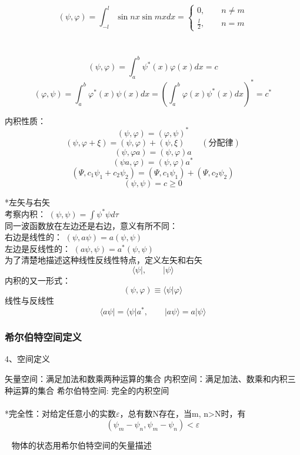 \begin{frame} 
    \frametitle{}
    \例 [3. 求定义在实数空间的两函数的内积]{\[\psi(x)=\sin nx, \varphi(x)=\sin mx\]}
    \解 ~ \[(\psi, \varphi)=\int_{-l} ^{l} \sin nx \sin mx dx=\begin{cases}
         0, \qquad n\neq m \\
        \frac{l}{2} , \qquad n=m
    \end{cases}
    \]
\end{frame} 

\begin{frame} 
    \frametitle{}
    \例 [4. 求定义在复数空间的两函数的内积]{}
    \解 ~ \[(\psi, \varphi)=\int_a ^b \psi^*(x)  \varphi(x) dx=c\]
    \[(\varphi,\psi)=\int_a ^b \varphi^*(x)\psi(x) dx = (\int_a ^b \varphi(x)\psi^*(x) dx) ^* =c^*\]
\end{frame} 

\begin{frame}
    内积性质：
    \[(\psi, \varphi)= (\varphi,\psi)^* \]
    \[(\psi, \varphi+\xi)= (\psi, \varphi) + (\psi, \xi)\qquad (\text{分配律})\]
    \[(\psi, \varphi a)= (\psi, \varphi )a \]
    \[(\psi a, \varphi )= (\psi, \varphi )a^* \]    
    \[(\Psi,c_1\psi_1+c_2\psi_2)=(\Psi,c_1\psi_1)+(\Psi,c_2\psi_2)\]
    \[(\psi,\psi)= c\ge 0\]
\end{frame}

\begin{frame}{}
    *左矢与右矢\\ \vspace{0.6em}
    考察内积： $(\psi,\psi)=\int\psi^*\psi d\tau$ \\
    同一波函数放在左边还是右边，意义有所不同： \\
    右边是线性的：  $(\psi,a\psi)=a (\psi,\psi)$ \\
    左边是反线性的：   $(a\psi,\psi)=a^* (\psi,\psi)$  \\
    为了清楚地描述这种线性反线性特点，定义左矢和右矢
    $$\langle \psi |, \qquad |\psi \rangle $$ 
    内积的又一形式：\[(\psi,\varphi)\equiv \langle \psi | \varphi \rangle\]
    线性与反线性$$\langle a\psi | = \langle \psi |a^* ,\qquad |a\psi \rangle = a|\psi \rangle$$ 
\end{frame}

\begin{frame}
    \frametitle{希尔伯特空间定义}
    4、空间定义\\
   \begin{itemize}
       \Item 矢量空间：满足加法和数乘两种运算的集合
       \Item 内积空间：满足加法、数乘和内积三种运算的集合
       \Item 希尔伯特空间:  完全的内积空间\\
       ~~ \\
       *完全性：对给定任意小的实数$\varepsilon$，总有数N存在，当m, n>N时，有\\
       $$ (\psi_m -\psi_n, \psi_m -\psi_n )< \varepsilon $$
   \end{itemize} 
   \Tips ~ 物体的状态用希尔伯特空间的矢量描述
\end{frame} 

